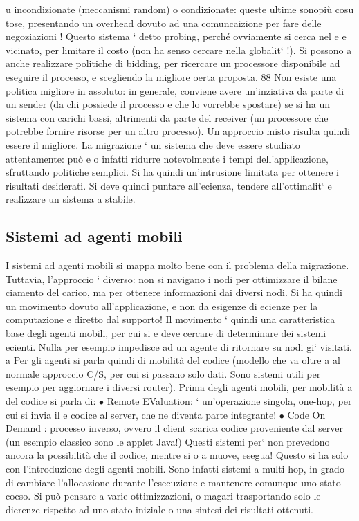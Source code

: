 \documentclass[a4paper,12pt]{article}
\begin{document}
u
incondizionate (meccanismi random) o condizionate: queste ultime sonopiù cosu
tose, presentando un overhead dovuto ad una comuncaizione per fare delle negoziazioni ! Questo sistema ` detto probing,
perché ovviamente si cerca nel
e
e
vicinato, per limitare il costo (non ha senso cercare nella globalit` !). Si possono
a
anche realizzare politiche di bidding, per ricercare un processore disponibile ad
eseguire il processo, e scegliendo la migliore oerta proposta.
88
Non esiste una politica migliore in assoluto: in generale, conviene avere
un'inziativa da parte di un sender (da chi possiede il processo e che lo vorrebbe
spostare) se si ha un sistema con carichi bassi, altrimenti da parte del receiver
(un processore che potrebbe fornire risorse per un altro processo). Un approccio
misto risulta quindi essere il migliore.
La migrazione ` un sistema che deve essere studiato attentamente: può
e
o
infatti ridurre notevolmente i tempi dell'applicazione, sfruttando politiche semplici. Si ha quindi un'intrusione
limitata per ottenere i risultati desiderati. Si
deve quindi puntare all'ecienza, tendere all'ottimalit` e realizzare un sistema
a
stabile.
\subsection{Sistemi ad agenti mobili}
I sistemi ad agenti mobili si mappa molto bene con il problema della migrazione.
Tuttavia, l'approccio ` diverso: non si navigano i nodi per ottimizzare il bilane
ciamento del carico, ma per ottenere informazioni dai diversi nodi. Si ha quindi
un movimento dovuto all'applicazione, e non da esigenze di ecienze per la
computazione e diretto dal supporto!
Il movimento ` quindi una caratteristica base degli agenti mobili, per cui si
e
deve cercare di determinare dei sistemi ecienti. Nulla per esempio impedisce
ad un agente di ritornare su nodi gi` visitati.
a
Per gli agenti si parla quindi di mobilità del codice (modello che va oltre
a
al normale approccio C/S, per cui si passano solo dati. Sono sistemi utili per
esempio per aggiornare i diversi router). Prima degli agenti mobili, per mobilità
a
del codice si parla di:
$\bullet$ Remote EValuation: ` un'operazione singola, one-hop, per cui si invia il
e
codice al server, che ne diventa parte integrante!
$\bullet$ Code On Demand : processo inverso, ovvero il client scarica codice proveniente dal server (un esempio classico
sono le applet Java!)
Questi sistemi per` non prevedono ancora la possibilità che il codice, mentre si
o
a
muove, esegua! Questo si ha solo con l'introduzione degli agenti mobili. Sono infatti sistemi a multi-hop, in grado di
cambiare l'allocazione durante l'esecuzione
e mantenere comunque uno stato coeso. Si può pensare a varie ottimizzazioni,
o
magari trasportando solo le dierenze rispetto ad uno stato iniziale o una sintesi
dei risultati ottenuti.
\end{document}
